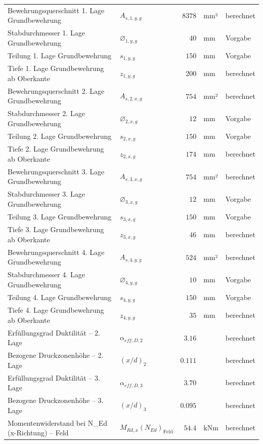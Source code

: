 \documentclass[11pt,a4paper]{article}
\begin{document}
\begin{xltabular}{\linewidth}{>{\raggedright\arraybackslash}Xlrll}
Bewehrungsquerschnitt 1. Lage Grundbewehrung & $A_{s,1,y,g}$ & $8378$ & mm² & berechnet \\
Stabdurchmesser 1. Lage Grundbewehrung & $\varnothing_{1,y,g}$ & $40$ & mm & Vorgabe \\
Teilung 1. Lage Grundbewehrung & $s_{1,y,g}$ & $150$ & mm & Vorgabe \\
Tiefe 1. Lage Grundbewehrung ab Oberkante & $z_{1,y,g}$ & $200$ & mm & berechnet \\
Bewehrungsquerschnitt 2. Lage Grundbewehrung & $A_{s,2,x,g}$ & $754$ & mm² & berechnet \\
Stabdurchmesser 2. Lage Grundbewehrung & $\varnothing_{2,x,g}$ & $12$ & mm & Vorgabe \\
Teilung 2. Lage Grundbewehrung & $s_{2,x,g}$ & $150$ & mm & Vorgabe \\
Tiefe 2. Lage Grundbewehrung ab Oberkante & $z_{2,x,g}$ & $174$ & mm & berechnet \\
Bewehrungsquerschnitt 3. Lage Grundbewehrung & $A_{s,3,x,g}$ & $754$ & mm² & berechnet \\
Stabdurchmesser 3. Lage Grundbewehrung & $\varnothing_{3,x,g}$ & $12$ & mm & Vorgabe \\
Teilung 3. Lage Grundbewehrung & $s_{3,x,g}$ & $150$ & mm & Vorgabe \\
Tiefe 3. Lage Grundbewehrung ab Oberkante & $z_{3,x,g}$ & $46$ & mm & berechnet \\
Bewehrungsquerschnitt 4. Lage Grundbewehrung & $A_{s,4,y,g}$ & $524$ & mm² & berechnet \\
Stabdurchmesser 4. Lage Grundbewehrung & $\varnothing_{4,y,g}$ & $10$ & mm & Vorgabe \\
Teilung 4. Lage Grundbewehrung & $s_{4,y,g}$ & $150$ & mm & Vorgabe \\
Tiefe 4. Lage Grundbewehrung ab Oberkante & $z_{4,y,g}$ & $35$ & mm & berechnet \\
Erfüllungsgrad Duktilität – 2. Lage & $\alpha_{eff,D,2}$ & $3.16$ &  & berechnet \\
Bezogene Druckzonenhöhe – 2. Lage & $\left(x/d\right)_{2}$ & $0.111$ &  & berechnet \\
Erfüllungsgrad Duktilität – 3. Lage & $\alpha_{eff,D,3}$ & $3.70$ &  & berechnet \\
Bezogene Druckzonenhöhe – 3. Lage & $\left(x/d\right)_{3}$ & $0.095$ &  & berechnet \\
Momentenwiderstand bei N\_Ed (x-Richtung) – Feld & $M_{Rd,x}(N_{Ed})_{\text{Feld}}$ & $54.4$ & kNm & berechnet \\

\end{xltabular}
\end{document}
